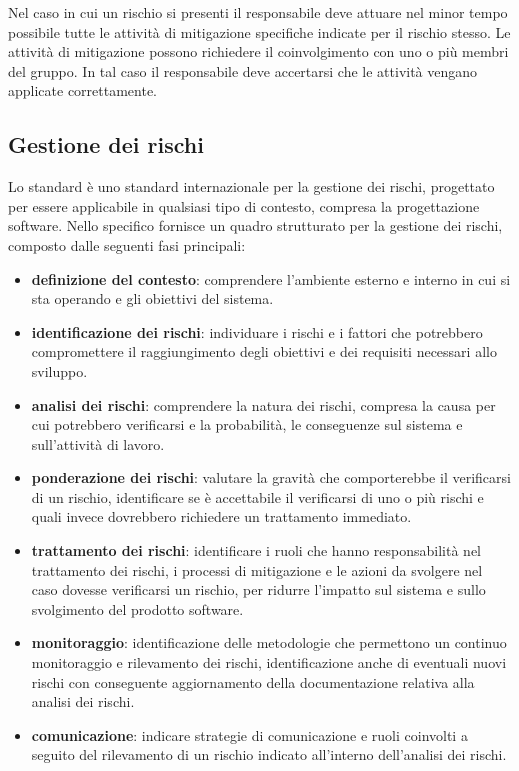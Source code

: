 \begin{enumerate}
    Nel caso in cui un rischio si presenti il responsabile deve attuare nel minor tempo possibile tutte le attività di mitigazione specifiche indicate per il rischio stesso.
    Le attività di mitigazione possono richiedere il coinvolgimento con uno o più membri del gruppo.
    In tal caso il responsabile deve accertarsi che le attività vengano applicate correttamente. 
\end{enumerate}

\subsection{Gestione dei rischi}
Lo standard  è uno standard internazionale per la gestione dei rischi, progettato per essere applicabile  in qualsiasi tipo di contesto, compresa la progettazione software.
Nello specifico fornisce un quadro strutturato per la gestione dei rischi, composto dalle seguenti fasi principali: 
\begin{itemize}
    \item \textbf{definizione del contesto}: comprendere l'ambiente esterno e interno in cui si sta operando e gli obiettivi del sistema.
    \item \textbf{identificazione dei rischi}: individuare i rischi e i fattori che potrebbero compromettere il raggiungimento degli obiettivi e dei requisiti necessari allo sviluppo.
    \item \textbf{analisi dei rischi}:  comprendere la natura dei rischi, compresa la causa per cui potrebbero verificarsi e la probabilità, le conseguenze sul sistema e sull'attività di lavoro.
    \item \textbf{ponderazione dei rischi}: valutare la gravità che comporterebbe il verificarsi di un rischio, identificare se è accettabile il verificarsi di uno o più rischi e quali invece dovrebbero richiedere un trattamento immediato.
    \item \textbf{trattamento dei rischi}: identificare i ruoli che hanno responsabilità nel trattamento dei rischi, i processi di mitigazione e le azioni da svolgere nel caso dovesse verificarsi un rischio, per ridurre l'impatto sul sistema e sullo svolgimento del prodotto software. 
    \item \textbf{monitoraggio}: identificazione delle metodologie che permettono un continuo monitoraggio e rilevamento dei rischi, identificazione anche di eventuali nuovi rischi con conseguente aggiornamento della documentazione relativa alla analisi dei rischi.
    \item \textbf{comunicazione}: indicare strategie di comunicazione e ruoli coinvolti a seguito del rilevamento di un rischio indicato all'interno dell'analisi dei rischi.
\end{itemize}
